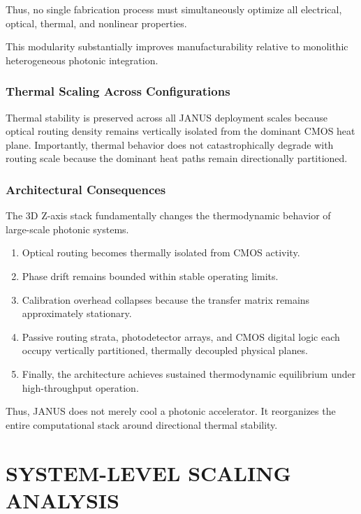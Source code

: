 \documentclass[journal]{IEEEtran}
\begin{document}
Thus, no single fabrication process must simultaneously optimize all electrical, optical, thermal, and nonlinear properties.

This modularity substantially improves manufacturability relative to monolithic heterogeneous photonic integration.

\subsubsection{\textbf{Thermal Scaling Across Configurations}}

Thermal stability is preserved across all JANUS deployment scales because optical routing density remains vertically isolated from the
dominant CMOS heat plane. Importantly, thermal behavior does not catastrophically degrade with routing scale because the dominant heat paths remain directionally partitioned.



\subsubsection{\textbf{Architectural Consequences}}

The 3D Z-axis stack fundamentally changes the thermodynamic behavior of large-scale photonic systems.

\begin{enumerate}
\item Optical routing becomes thermally isolated from CMOS activity.
\item Phase drift remains bounded within stable operating limits.
\item Calibration overhead collapses because the transfer matrix remains approximately stationary.
\item Passive routing strata, photodetector arrays, and CMOS digital logic each occupy vertically partitioned, thermally decoupled physical planes.
\item Finally, the architecture achieves sustained thermodynamic equilibrium under high-throughput operation.
\end{enumerate}

Thus, JANUS does not merely cool a photonic accelerator. It reorganizes the entire computational stack around directional thermal stability.

\section{SYSTEM-LEVEL SCALING ANALYSIS}
\label{sec:system_scaling}
\end{document}
